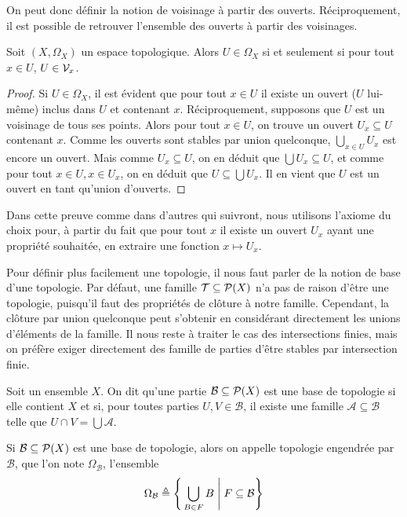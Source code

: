 On peut donc définir la notion de voisinage à partir des ouverts.
Réciproquement, il est possible de retrouver l'ensemble des ouverts à partir des
voisinages.

\begin{proposition}
  Soit $(X,\Omega_X)$ un espace topologique. Alors $U\in \Omega_X$ si et
  seulement si pour tout $x\in U$, $U\in\mathcal{V}_x$.
\end{proposition}

\begin{proof}
  Si $U\in \Omega_X$, il est évident que pour tout $x\in U$ il existe un ouvert
  ($U$ lui-même) inclus dans $U$ et contenant $x$. Réciproquement, supposons que
  $U$ est un voisinage de tous ses points. Alors pour tout $x\in U$, on trouve
  un ouvert $U_x\subseteq U$ contenant $x$. Comme les ouverts sont stables par
  union quelconque, $\displaystyle\bigcup_{x\in U} U_x$ est encore un ouvert.
  Mais comme $U_x\subseteq U$, on en déduit que $\bigcup U_x \subseteq U$, et
  comme pour tout $x\in U, x\in U_x$, on en déduit que $U\subseteq\bigcup U_x$.
  Il en vient que $U$ est un ouvert en tant qu'union d'ouverts.
\end{proof}

\begin{remark}
  Dans cette preuve comme dans d'autres qui suivront, nous utilisons l'axiome du
  choix pour, à partir du fait que pour tout $x$ il existe un ouvert $U_x$
  ayant une propriété souhaitée, en extraire une fonction $x \mapsto U_x$.
\end{remark}

Pour définir plus facilement une topologie, il nous faut parler de la notion de
base d'une topologie. Par défaut, une famille $\mathcal T\subseteq\mathcal{P}(X)$
n'a pas de raison d'être une topologie, puisqu'il faut des propriétés de clôture
à notre famille. Cependant, la clôture par union quelconque peut s'obtenir en
considérant directement les unions d'éléments de la famille. Il nous reste à
traiter le cas des intersections finies, mais on préfère exiger directement des
famille de parties d'être stables par intersection finie.

\begin{definition}
  Soit un ensemble $X$. On dit qu'une partie $\mathcal B\subseteq\mathcal{P}(X)$
  est une base de topologie si elle contient $X$ et si, pour toutes parties
  $U,V\in \mathcal B$, il existe une famille $\mathcal A \subseteq \mathcal B$
  telle que $\displaystyle U \cap V = \bigcup \mathcal A$.

  Si $\mathcal B\subseteq\mathcal{P}(X)$ est une base de topologie, alors on
  appelle topologie engendrée par $\mathcal B$, que l'on note
  $\Omega_{\mathcal B}$, l'ensemble
  \[\Omega_{\mathcal B} \triangleq \Bigg\{\bigcup_{B \in F} B\;\Bigg|\;
  F\subseteq \mathcal B\Bigg\}\]
\end{definition}

